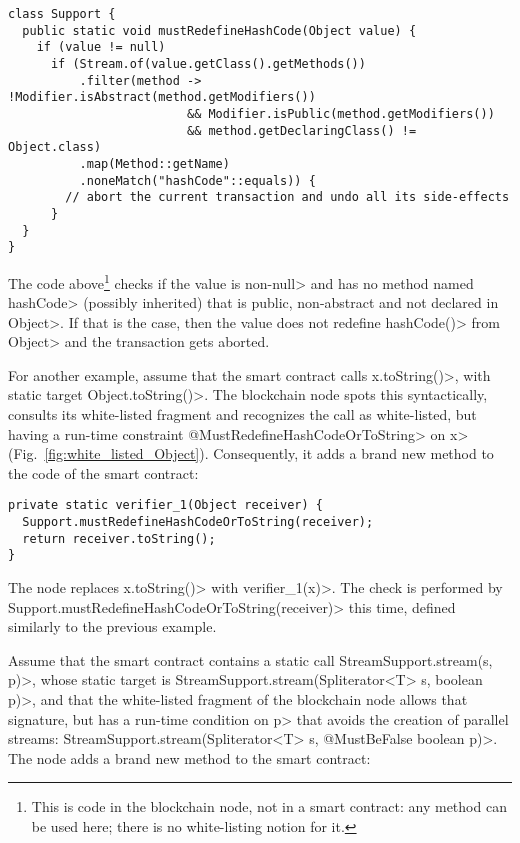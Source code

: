 {\small\begin{verbatim}
class Support {
  public static void mustRedefineHashCode(Object value) {
    if (value != null)
      if (Stream.of(value.getClass().getMethods())
          .filter(method -> !Modifier.isAbstract(method.getModifiers())
                         && Modifier.isPublic(method.getModifiers())
                         && method.getDeclaringClass() != Object.class)
          .map(Method::getName)
          .noneMatch("hashCode"::equals)) {
        // abort the current transaction and undo all its side-effects
      }
  }
}
\end{verbatim}}

\noindent
The code above\footnote{This is code in the blockchain node, not in a smart contract:
  any method can be used here; there is no white-listing notion for it.}
checks if the value is non-\<null> and has no method
named \<hashCode>
(possibly inherited) that is public, non-abstract and not declared in \<Object>.
If that is the case, then the value does not redefine \<hashCode()> from \<Object>
and the transaction gets aborted.

For another example, assume that the smart contract calls
\<x.toString()>, with static target \<Object.toString()>.
The blockchain node spots this syntactically,
consults its white-listed fragment and recognizes the call as
white-listed, but having a run-time constraint \<@MustRedefineHashCodeOrToString> on
\<x> (Fig.~\ref{fig:white_listed_Object}).
Consequently, it adds a brand new method to the code of the smart contract:

{\small\begin{verbatim}
private static verifier_1(Object receiver) {
  Support.mustRedefineHashCodeOrToString(receiver);
  return receiver.toString();
}
\end{verbatim}}

\noindent
The node replaces \<x.toString()> with \<verifier\_1(x)>.
The check is performed by \<Support.mustRedefineHashCodeOrToString(receiver)> this time,
defined similarly to the previous example.

Assume that the smart contract contains a static call
\<StreamSupport.stream(s, p)>, whose static target is
\<StreamSupport.stream(Spliterator$\text{<}$T$\text{>}$ s, boolean p)>,
and that the white-listed fragment of the blockchain node allows that signature,
but has a run-time condition on \<p> that avoids the creation of parallel streams:
\<StreamSupport.stream(Spliterator$\text{<}$T$\text{>}$ s, @MustBeFalse boolean p)>.
The node adds a brand new method to the smart contract:

